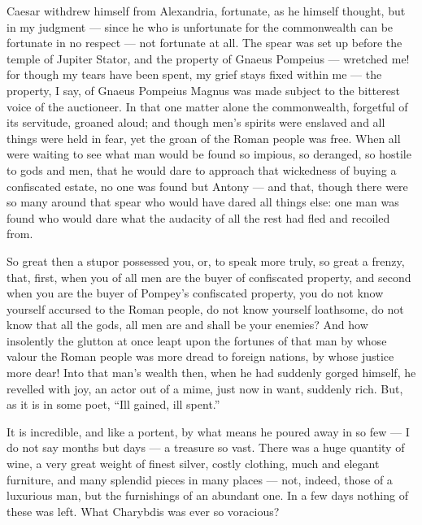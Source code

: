 Caesar withdrew himself from Alexandria, fortunate, as he himself thought, but in my judgment --- since he who is unfortunate for the commonwealth can be fortunate in no respect --- not fortunate at all. The spear was set up before the temple of Jupiter Stator, and the property of Gnaeus Pompeius --- wretched me! for though my tears have been spent, my grief stays fixed within me --- the property, I say, of Gnaeus Pompeius Magnus was made subject to the bitterest voice of the auctioneer. In that one matter alone the commonwealth, forgetful of its servitude, groaned aloud; and though men's spirits were enslaved and all things were held in fear, yet the groan of the Roman people was free. When all were waiting to see what man would be found so impious, so deranged, so hostile to gods and men, that he would dare to approach that wickedness of buying a confiscated estate, no one was found but Antony --- and that, though there were so many around that spear who would have dared all things else: one man was found who would dare what the audacity of all the rest had fled and recoiled from.

 So great then a stupor possessed you, or, to speak more truly, so great a frenzy, that, first, when you of all men are the buyer of confiscated property, and second when you are the buyer of Pompey's confiscated property, you do not know yourself accursed to the Roman people, do not know yourself loathsome, do not know that all the gods, all men are and shall be your enemies? And how insolently the glutton at once leapt upon the fortunes of that man by whose valour the Roman people was more dread to foreign nations, by whose justice more dear! Into that man's wealth then, when he had suddenly gorged himself, he revelled with joy, an actor out of a mime, just now in want, suddenly rich. But, as it is in some poet, ``Ill gained, ill spent.''

 It is incredible, and like a portent, by what means he poured away in so few --- I do not say months but days --- a treasure so vast. There was a huge quantity of wine, a very great weight of finest silver, costly clothing, much and elegant furniture, and many splendid pieces in many places --- not, indeed, those of a luxurious man, but the furnishings of an abundant one. In a few days nothing of these was left. What Charybdis was ever so voracious?

